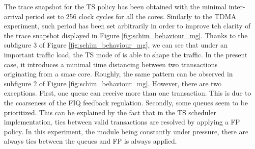        The trace snapshot for the TS policy has been obtained with the minimal inter-arrival period set to 256 clock cycles for all the cores. Sinilarly to the TDMA experiment, such period has been set arbitrarily in order to improve teh clarity of the trace snapshot displayed in Figure \ref{fig:schim_behaviour_mg}.
       Thanks to the subfigure 3 of Figure \ref{fig:schim_behaviour_mg}, we can see that under an important traffic load, the TS mode of \schim is able to shape the traffic. In the present case, it introduces a minimal time distancing between two transactions originating from a smae core.
       Roughly, the same pattern can be observed in subfigure 2 of Figure \ref{fig:schim_behaviour_mg}. However, there are two exceptions. First, one queue can receive more than one transaction. This is due to the coarseness of the FIQ feedback regulation. Secondly, some queues seem to be prioritized. This can be explained by the fact that in the TS scheduler implementation, ties between valid transactions are resolved by applying a FP policy. In this experiment, the \schim module being constantly under pressure, there are always ties between the queues and FP is always applied.
